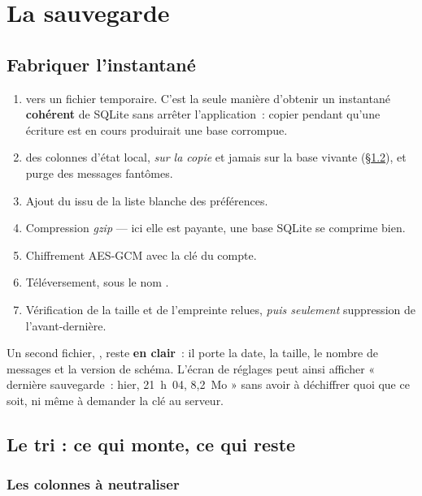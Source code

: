 \documentclass[11pt,a4paper,oneside]{report}
\begin{document}
\chapter{La sauvegarde}
\label{ch:sauvegarde-tech}

\section{Fabriquer l'instantané}

\begin{enumerate}[leftmargin=*]
  \item {} vers un fichier temporaire. C'est la seule manière d'obtenir un
        instantané \textbf{cohérent} de SQLite sans arrêter l'application~: copier
         pendant qu'une écriture est en cours produirait une base
        corrompue.
  \item {} des colonnes d'état local, \emph{sur la copie} et jamais sur la
        base vivante (§\ref{sec:tri}), et purge des messages fantômes.
  \item Ajout du  issu de la liste blanche des préférences.
  \item Compression \emph{gzip} --- ici elle est payante, une base SQLite se comprime bien.
  \item Chiffrement AES-GCM avec la clé du compte.
  \item Téléversement, sous le nom
        .
  \item Vérification de la taille et de l'empreinte relues, \emph{puis seulement} suppression
        de l'avant-dernière.
\end{enumerate}

Un second fichier, , reste \textbf{en clair}~: il
porte la date, la taille, le nombre de messages et la version de schéma. L'écran de réglages
peut ainsi afficher « dernière sauvegarde~: hier, 21~h~04, 8,2~Mo » sans avoir à déchiffrer
quoi que ce soit, ni même à demander la clé au serveur.

\section{Le tri : ce qui monte, ce qui reste}
\label{sec:tri}

\subsection{Les colonnes à neutraliser}
\end{document}
